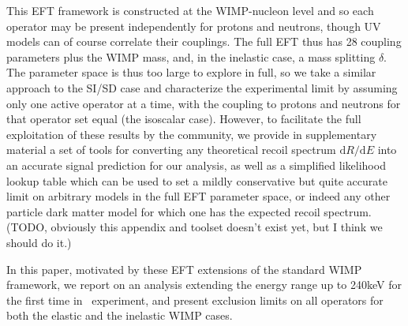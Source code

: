 This EFT framework is constructed at the WIMP-nucleon level and so each operator may be present independently for protons and neutrons, though UV models can of course correlate their couplings. The full EFT thus has 28 coupling parameters plus the WIMP mass, and, in the inelastic case, a mass splitting $\delta$. The parameter space is thus too large to explore in full, so we take a similar approach to the SI/SD case and characterize the experimental limit by assuming only one active operator at a time, with the coupling to protons and neutrons for that operator set equal (the isoscalar case). However, to facilitate the full exploitation of these results by the community, we provide in supplementary material a set of tools for converting any theoretical recoil spectrum $\mathrm{d}R/\mathrm{d}E$ into an accurate signal prediction for our analysis, as well as a simplified likelihood lookup table which can be used to set a mildly conservative but quite accurate limit on arbitrary models in the full EFT parameter space, or indeed any other particle dark matter model for which one has the expected recoil spectrum. (TODO, obviously this appendix and toolset doesn't exist yet, but I think we should do it.) 

In this paper, motivated by these EFT extensions of the standard WIMP framework, we report on an analysis extending the energy range up to 240keV for the first time in \Xehund\ experiment, and present exclusion limits on all operators for both the elastic and the inelastic WIMP cases.     


